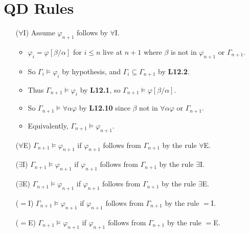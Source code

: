 \documentclass[a4paper, 11pt]{article} %
\newcommand{\qt}[2]{#1 #2} %
\newcommand{\unisub}[2]{[#1/#2]}
\renewcommand{\models}{\vDash}
\def\metaA{\ensuremath{\varphi}}
\begin{document}
\section*{QD Rules}

\begin{enumerate}[labelsep=.1in]
  \item[($\forall$I)] Assume $\metaA_{n+1}$ follows by $\forall$I. 
    \begin{itemize}
      \item $\metaA_i=\metaA\unisub{\beta}{\alpha}$ for $i\leq n$ live at $n+1$ where $\beta$ is not in $\metaA_{n+1}$ or $\Gamma_{n+1}$. 
      \item So $\Gamma_i\models\metaA_i$ by hypothesis, and $\Gamma_i\subseteq\Gamma_{n+1}$ by \textbf{L12.2}.
      \item Thus $\Gamma_{n+1}\models\metaA_i$ by \textbf{L12.1}, so $\Gamma_{n+1}\models\metaA\unisub{\beta}{\alpha}$.
      \item So $\Gamma_{n+1}\models \qt{\forall}{\alpha}\metaA$ by \textbf{L12.10} since $\beta$ not in $\qt{\forall}{\alpha}\metaA$ or $\Gamma_{n+1}$.
      \item Equivalently, $\Gamma_{n+1}\models \metaA_{n+1}$.
    \end{itemize}
  \item[($\forall$E)] $\Gamma_{n+1} \models \metaA_{n+1}$ if $\metaA_{n+1}$ follows from $\Gamma_{n+1}$ by the rule $\forall$E. 
  \item[($\exists$I)] $\Gamma_{n+1} \models \metaA_{n+1}$ if $\metaA_{n+1}$ follows from $\Gamma_{n+1}$ by the rule $\exists$I. 
  \item[($\exists$E)] $\Gamma_{n+1} \models \metaA_{n+1}$ if $\metaA_{n+1}$ follows from $\Gamma_{n+1}$ by the rule $\exists$E. 
  \item[($=$I)] $\Gamma_{n+1} \models \metaA_{n+1}$ if $\metaA_{n+1}$ follows from $\Gamma_{n+1}$ by the rule $=$I. 
  \item[($=$E)] $\Gamma_{n+1} \models \metaA_{n+1}$ if $\metaA_{n+1}$ follows from $\Gamma_{n+1}$ by the rule $=$E. 
\end{enumerate}
\end{document}
